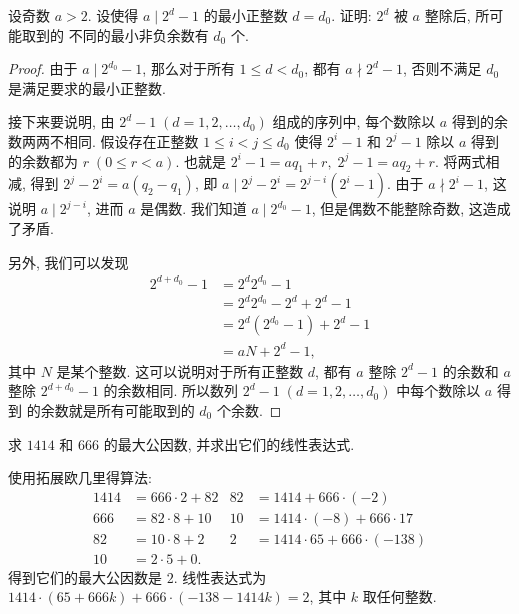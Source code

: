 \documentclass[a5paper,fleqn,10pt]{article}
\begin{document}
\begin{exmp}
    设奇数 $a>2$. 设使得 $a\mid 2^d-1$ 的最小正整数 $d=d_0$. 证明: $2^d$ 被 $a$ 整除后, 所可能取到的
    不同的最小非负余数有 $d_0$ 个.
    \begin{proof}
        由于 $a\mid 2^{d_0}-1$, 那么对于所有 $1\leq d<d_0$, 都有 $a\nmid 2^d-1$, 否则不满足 $d_0$
        是满足要求的最小正整数.
        
        接下来要说明, 由 $2^d-1\;(d=1,2,\ldots,d_0)$ 组成的序列中, 每个数除以
        $a$ 得到的余数两两不相同. 假设存在正整数 $1\leq i<j\leq d_0$ 使得 $2^i-1$ 和 $2^j-1$
        除以 $a$ 得到的余数都为 $r\;(0\leq r<a)$. 也就是 $2^i-1=aq_1+r,\;2^j-1=aq_2+r$.
        将两式相减, 得到 $2^j-2^i=a(q_2-q_1)$, 即 $a\mid 2^j-2^i=2^{j-i}(2^i-1)$. 由于
        $a\nmid 2^i-1$, 这说明 $a\mid 2^{j-i}$, 进而 $a$ 是偶数. 我们知道 $a\mid 2^{d_0}-1$,
        但是偶数不能整除奇数, 这造成了矛盾.

        另外, 我们可以发现
        \begin{align*}
            2^{d+d_0}-1&=2^d2^{d_0}-1\\
            &=2^d2^{d_0}-2^d+2^d-1\\
            &=2^d(2^{d_0}-1)+2^d-1\\
            &=aN+2^d-1,
        \end{align*}
        其中 $N$ 是某个整数. 这可以说明对于所有正整数 $d$, 都有 $a$ 整除 $2^d-1$ 的余数和 $a$ 整除
        $2^{d+d_0}-1$ 的余数相同. 所以数列 $2^d-1\;(d=1,2,\ldots,d_0)$ 中每个数除以 $a$ 得到
        的余数就是所有可能取到的 $d_0$ 个余数.
    \end{proof}
\end{exmp}

\begin{exmp}
    求 $1414$ 和 $666$ 的最大公因数, 并求出它们的线性表达式.
    \begin{solution}
        使用拓展欧几里得算法:
        \begin{align*}
            1414 & =666\cdot2+82 & 82 & =1414+666\cdot(-2)          \\
            666  & =82\cdot8+10  & 10 & =1414\cdot(-8)+666\cdot17   \\
            82   & =10\cdot8+2   & 2  & =1414\cdot65+666\cdot(-138) \\
            10   & =2\cdot5+0.
        \end{align*}
        得到它们的最大公因数是 $2$. 线性表达式为 $1414\cdot(65+666k)+666\cdot(-138-1414k)=2$, 其中 $k$ 取任何整数.
    \end{solution}
\end{exmp}
\end{document}
